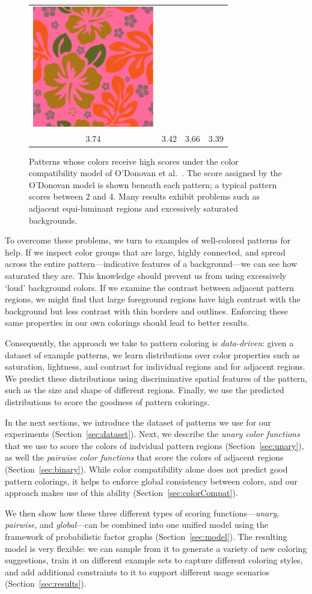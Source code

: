 \begin{figure}[htb]
\begin{tabular}{cccc}
\includegraphics[width=.2\columnwidth]{figs/colorCompat/r_1_3_3-39}\\
3.74&3.42&3.66&3.39\\
\end{tabular}
\caption{Patterns whose colors receive high scores under the color compatibility model of O'Donovan et al.~. The score assigned by the O'Donovan model is shown beneath each pattern; a typical pattern scores between 2 and 4. Many results exhibit problems such as adjacent equi-luminant regions and excessively saturated backgrounds.}
\label{fig:ColorCompatOnly}
\end{figure}

To overcome these problems, we turn to examples of well-colored patterns for help. If we inspect color groups that are large, highly connected, and spread across the entire pattern---indicative features of a background---we can see how saturated they are. This knowledge should prevent us from using excessively `loud' background colors. If we examine the contrast between adjacent pattern regions, we might find that large foreground regions have high contrast with the background but less contrast with thin borders and outlines. Enforcing these same properties in our own colorings should lead to better results.

Consequently, the approach we take to pattern coloring is \emph{data-driven}: given a dataset of example patterns, we learn distributions over color properties such as saturation, lightness, and contrast for individual regions and for adjacent regions. We predict these distributions using discriminative spatial features of the pattern, such as the size and shape of different regions. Finally, we use the predicted distributions to score the goodness of pattern colorings.

In the next sections, we introduce the dataset of patterns we use for our experiments (Section~\ref{sec:dataset}). Next, we describe the \emph{unary color functions} that we use to score the colors of indvidual pattern regions (Section~\ref{sec:unary}), as well the \emph{pairwise color functions} that score the colors of adjacent regions (Section~\ref{sec:binary}). While color compatibility alone does not predict good pattern colorings, it helps to enforce global consistency between colors, and our approach makes use of this ability (Section~\ref{sec:colorCompat}).

We then show how these three different types of scoring functions---\emph{unary}, \emph{pairwise}, and \emph{global}---can be combined into one unified model using the framework of probabilistic factor graphs (Section~\ref{sec:model}). The resulting model is very flexible: we can sample from it to generate a variety of new coloring suggestions, train it on different example sets to capture different coloring styles, and add additional constraints to it to support different usage scenarios (Section~\ref{sec:results}).
